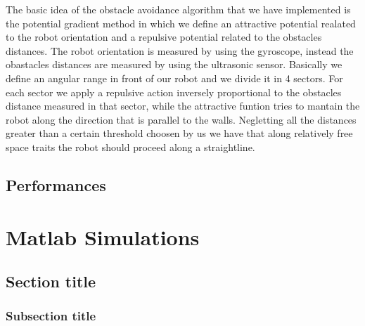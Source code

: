 \documentclass[a4paper,11pt,oneside]{book}
\begin{document}
The basic idea of the obstacle avoidance algorithm that we have implemented is the potential gradient method in which we define an attractive potential realated to the robot orientation and a repulsive potential related to the obstacles distances. The robot orientation is measured by using the gyroscope, instead the obastacles distances are measured by using the ultrasonic sensor. Basically we define an angular range in front of our robot and we divide it in 4 sectors. For each sector we apply a repulsive action inversely proportional to the obstacles distance measured in that sector, while the attractive funtion tries to mantain the robot along the direction that is parallel to the walls. Negletting all the distances greater than a certain threshold choosen by us we have that along relatively free space traits the robot should proceed along a straightline.
\section{Performances}






\chapter{Matlab Simulations}

\section{Section title}
\subsection {Subsection title}







{}

\end{document}
